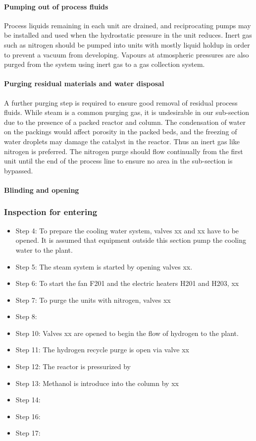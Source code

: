 \paragraph{Pumping out of process fluids}
Process liquids remaining in each unit are drained, and reciprocating pumps may be installed and used when the hydrostatic pressure in the unit reduces. Inert gas such as nitrogen should be pumped into units with mostly liquid holdup in order to prevent a vacuum from developing. Vapours at atmospheric pressures are also purged from the system using inert gas to a gas collection system.

\paragraph{Purging residual materials and water disposal}
A further purging step is required to ensure good removal of residual process fluids. While steam is a common purging gas, it is undesirable in our sub-section due to the presence of a packed reactor and column. The condensation of water on the packings would affect porosity in the packed beds, and the freezing of water droplets may damage the catalyst in the reactor. Thus an inert gas like nitrogen is preferred. The nitrogen purge should flow continually from the first unit until the end of the process line to ensure no area in the sub-section is bypassed.


\paragraph{Blinding and opening}

\subsubsection{Inspection for entering}


\begin{itemize}
    \item Step 4: To prepare the cooling water system, valves xx and xx have to be opened. It is assumed that equipment outside this section pump the cooling water to the plant.
    \item Step 5: The steam system is started by opening valves xx.
    \item Step 6: To start the fan F201 and the electric heaters H201 and H203, xx
    \item Step 7: To purge the units with nitrogen, valves xx
    \item Step 8: 
    \item Step 10: Valves xx are opened to begin the flow of hydrogen to the plant.
    \item Step 11: The hydrogen recycle purge is open via valve xx
    \item Step 12: The reactor is pressurized by
    \item Step 13: Methanol is introduce into the column by xx
    \item Step 14:
    \item Step 16:
    \item Step 17:
\end{itemize}